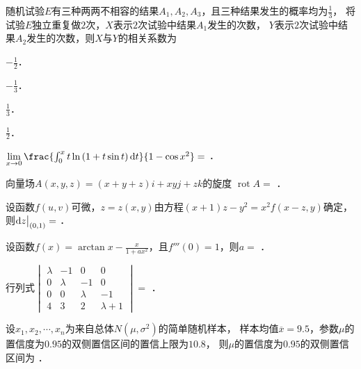 \documentclass[plain,noanswer,medmath]{../../template/jnuexam}
\begin{document}
\begin{problem}
随机试验$E$有三种两两不相容的结果$A_1,A_2,A_3$，且三种结果发生的概率均为$\frac{1}{3}$，
将试验$E$独立重复做$2$次，$X$表示$2$次试验中结果$A_1$发生的次数，
$Y$表示$2$次试验中结果$A_2$发生的次数，则$X$与$Y$的相关系数为\pickout{}
\begin{abcd}
\item $- \frac{1}{2}$．
\item $- \frac{1}{3}$．
\item $\frac{1}{3}$．
\item $\frac{1}{2}$．
\end{abcd}
\end{problem}




\begin{problem}
$\lim_{x \to 0} \frac{\int_0^x t\ln \left(1 + t\sin t \right)\dt}{1 - \cos x^2} =$ \fillin{}．
\end{problem}


\begin{problem}
向量场$A\left(x,y,z \right) = \left(x + y + z \right)i + xyj + zk$的旋度
$\operatorname{rot} A =$ \fillin{}．
\end{problem}


\begin{problem}
设函数$f(u,v)$可微，$z = z(x,y)$由方程$(x + 1)z - y^2 = x^2 f(x - z,y)$确定，
则$\mathop{}\!\mathrm{d} z\big|_{(0,1)}=$ \fillin{}．
\end{problem}


\begin{problem}
设函数$f(x) = \arctan x - \frac{x}{1 + ax^2}$，且$f'''(0) = 1$，则$a =$ \fillin{}．
\end{problem}


\begin{problem}
行列式$\begin{vmatrix}
  \lambda &      -1 &       0 & 0 \\
        0 & \lambda &      -1 & 0 \\
        0 &       0 & \lambda & -1 \\
        4 &       3 &       2 & \lambda + 1
\end{vmatrix} =$ \fillin{}．
\end{problem}


\begin{problem}
设$x_1,x_2, \cdots ,x_n$为来自总体$N\left(\mu ,\sigma^2 \right)$的简单随机样本，
样本均值$\overline{x} = 9.5$，参数$\mu$的置信度为$0.95$的双侧置信区间的置信上限为$10.8$，
则$\mu$的置信度为$0.95$的双侧置信区间为 \fillin{}．
\end{problem}
\end{document}
